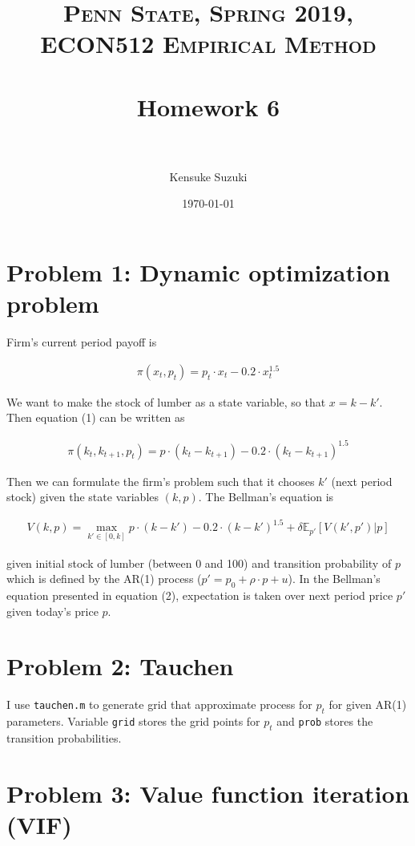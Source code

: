 \documentclass[11pt,letter]{article}
\title{	
\normalfont \normalsize 
\textsc{Penn State, Spring 2019, ECON512 Empirical Method} \\ [25pt] %
\horrule{0.5pt} \\[0.4cm] %
\huge Homework 6 \\ %
\horrule{2pt} \\[0.5cm] %
}
\author{Kensuke Suzuki} %
\date{\normalsize\today} %
\newcounter{lem}[section] \setcounter{lem}{0}
\newcommand{\lprn}[1]{\left[{#1}\right]}
\newcommand{\code}[1]{\texttt{#1}}
\begin{document}
\maketitle %


\section*{Problem 1: Dynamic optimization problem}

Firm's current period payoff is

\begin{align}
\pi(x_t, p_t) = p_t \cdot x_t - 0.2 \cdot x_t^{1.5} 
\end{align}

We want to make the stock of lumber as a state variable, so that $x=k-k'$.  Then equation (1) can be written as

\begin{align}
\pi(k_t,k_{t+1},p_t) = p \cdot (k_{t}-k_{t+1}) - 0.2 \cdot (k_{t}-k_{t+1})^{1.5}
\end{align}

Then we can formulate the firm's problem such that it chooses $k'$ (next period stock) given the state variables $(k,p)$. The Bellman's equation is

\begin{align}
V(k,p) = \max_{k'\in[0,k]}  p \cdot (k-k') - 0.2 \cdot (k-k')^{1.5} + \delta \mathbb{E}_{p'}\lprn{V(k',p')|p}
\end{align}

given initial stock of lumber (between 0 and 100) and transition probability of $p$ which is defined by the AR(1) process ($p'= p_0 + \rho\cdot p + u$). In the Bellman's equation presented in equation (2), expectation is taken over next period price $p'$ given today's price $p$.


\section*{Problem 2: Tauchen}

I use \code{tauchen.m} to generate grid that approximate process for $p_t$ for given AR(1) parameters. Variable \code{grid} stores the grid points for $p_t$ and \code{prob} stores the transition probabilities.

\newpage
\section*{Problem 3: Value function iteration (VIF)}
\end{document}
